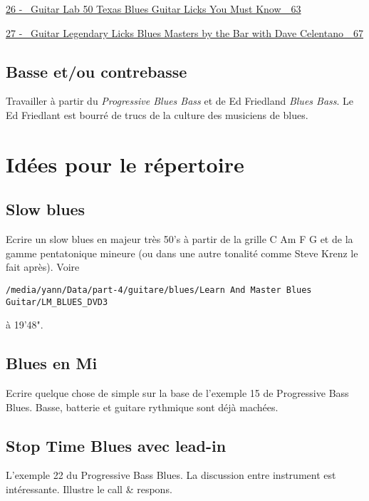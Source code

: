 \documentclass[a4paper]{book}
\begin{document}
\hyperlink{RefHeadingToc152973218262}{26 - \ Guitar Lab 50 Texas Blues
Guitar Licks You Must Know\ \ 63}

\hyperlink{RefHeadingToc154973218262}{27 - \ Guitar Legendary Licks
Blues Masters by the Bar with Dave Celentano\ \ 67}

\section{Basse et/ou contrebasse}
Travailler à partir du \emph{Progressive Blues Bass} et de Ed Friedland \emph{Blues Bass}. Le Ed Friedlant est bourré de trucs de la culture des musiciens de blues.

\chapter{Idées pour le répertoire}
\section{Slow blues}
Ecrire un slow blues en majeur très 50's à partir de la grille C Am F G et de la gamme pentatonique mineure (ou dans une autre tonalité comme Steve Krenz le fait après). Voire \begin{verbatim}
/media/yann/Data/part-4/guitare/blues/Learn And Master Blues Guitar/LM_BLUES_DVD3
\end{verbatim} à 19'48".

\section{Blues en Mi}
Ecrire quelque chose de simple sur la base de l'exemple 15 de Progressive Bass Blues. Basse, batterie et guitare rythmique sont déjà machées.

\section{Stop Time Blues avec lead-in}
L'exemple 22 du Progressive Bass Blues. La discussion entre instrument est intéressante. Illustre le call \& respons.
\end{document}
